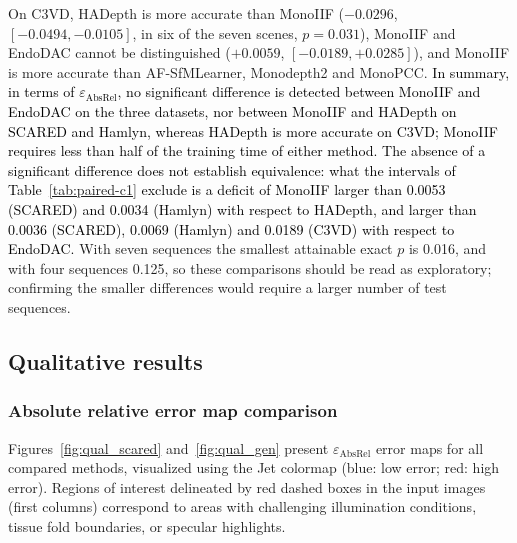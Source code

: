\documentclass[a4paper,fleqn]{cas-dc}
\begin{document}
{On C3VD, HADepth is more accurate than MonoIIF ($-0.0296$, $[-0.0494, -0.0105]$, in six of the seven scenes, $p=0.031$), MonoIIF and EndoDAC cannot be distinguished ($+0.0059$, $[-0.0189, +0.0285]$), and MonoIIF is more accurate than AF-SfMLearner, Monodepth2 and MonoPCC.
\textcolor{black}{In summary, in terms of $\varepsilon_\textrm{AbsRel}$, no significant difference is detected between MonoIIF and EndoDAC on the three datasets, nor between MonoIIF and HADepth on SCARED and Hamlyn, whereas HADepth is more accurate on C3VD; MonoIIF requires less than half of the training time of either method. The absence of a significant difference does not establish equivalence: what the intervals of Table~\ref{tab:paired-c1} exclude is a deficit of MonoIIF larger than 0.0053 (SCARED) and 0.0034 (Hamlyn) with respect to HADepth, and larger than 0.0036 (SCARED), 0.0069 (Hamlyn) and 0.0189 (C3VD) with respect to EndoDAC.} With seven sequences the smallest attainable exact $p$ is 0.016, and with four sequences 0.125, so these comparisons should be read as exploratory; confirming the smaller differences would require a larger number of test sequences.
}
%
\subsection{Qualitative results}
\subsubsection{Absolute relative error map comparison}

Figures~\ref{fig:qual_scared} and~\ref{fig:qual_gen} present $\varepsilon_{\text{AbsRel}}$ error maps for 
all compared methods, visualized using the Jet colormap (blue: low error; red: high error). Regions of interest delineated by red dashed boxes in the input images (first columns) correspond to areas with challenging illumination conditions, tissue fold boundaries, or specular highlights.
\end{document}
